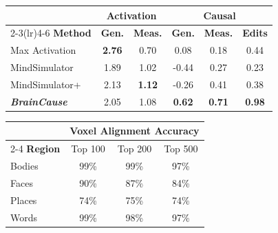 \documentclass{llmxive}
\providecommand{\arraystretch}{1.25}
\begin{document}
\begin{figure}[t]
\centering

\begin{minipage}[t]{0.50\textwidth}
\centering
\small
\renewcommand{\arraystretch}{1.25}
\setlength{\tabcolsep}{3pt}


\label{tab:quant_main}

\vspace{0.05cm}

\begin{tabular}{@{}lccccc@{}}
\toprule
& \multicolumn{2}{c}{\textbf{Activation}}
& \multicolumn{3}{c}{\textbf{Causal}} \\
\cmidrule(lr){2-3}\cmidrule(lr){4-6}
\textbf{Method}
& \textbf{Gen.}
& \textbf{Meas.}
& \textbf{Gen.}
& \textbf{Meas.}
& \textbf{Edits} \\
\midrule
Max Activation
& \textbf{2.76} & 0.70 & 0.08 & 0.18 & 0.44 \\
MindSimulator
& 1.89 & 1.02 & -0.44 & 0.27 & 0.23 \\
MindSimulator+
& 2.13 & \textbf{1.12} & -0.26 & 0.41 & 0.38 \\
\emph{\textbf{BrainCause}}
& 2.05 & 1.08 & \textbf{0.62} & \textbf{0.71} & \textbf{0.98} \\
\bottomrule
\end{tabular}

\end{minipage}\hfill%
\begin{minipage}[t]{0.47\textwidth}
\centering
\small
\renewcommand{\arraystretch}{1.25}
\setlength{\tabcolsep}{10pt}

\label{tab:known_roi_sanity}

\vspace{0.05cm}

\begin{tabular}{@{}lccc@{}}
\toprule
& \multicolumn{3}{c}{\textbf{Voxel Alignment Accuracy}} \\
\cmidrule(l){2-4}
\textbf{Region} & Top 100 & Top 200 & Top 500 \\
\midrule
Bodies & 99\% & 99\% & 97\% \\
Faces  & 90\% & 87\% & 84\% \\
Places & 74\% & 75\% & 74\% \\
Words  & 99\% & 98\% & 97\% \\
\bottomrule
\end{tabular}

\end{minipage}

\end{figure}
\end{document}
